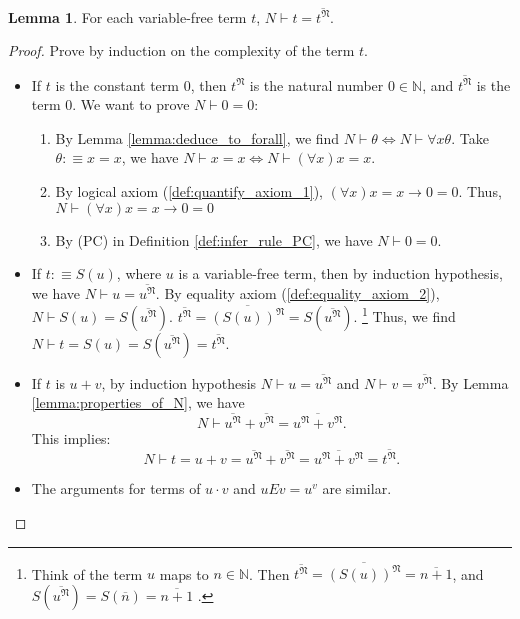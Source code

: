 \documentclass[11pt,letterpaper]{book}
\theoremstyle{definition}
\newtheorem{lemma}{Lemma}[section]
\begin{document}
\begin{lemma}\label{lemma:N_terms_equivalence}
For each variable-free term $t$, $N \vdash t = \overline{t^{\mathfrak{N}}}$.
\end{lemma}

\begin{proof}
Prove by induction on the complexity of the term $t$.

\begin{itemize}
\item{If $t$ is the constant term $0$, then $t^{\mathfrak{N}}$ is the natural number $0 \in \mathbb{N}$, and $\overline{t^{\mathfrak{N}}}$ is the term $0$. We want to prove $N \vdash 0 = 0$:  }

\begin{enumerate}
\item{By Lemma \ref{lemma:deduce_to_forall}, we find $N \vdash \theta \iff N \vdash \forall x \theta$. Take $\theta :\equiv x =x$, we have $N \vdash x = x \iff N \vdash (\forall x) x = x$.}
\item{By logical axiom (\ref{def:quantify_axiom_1}), $(\forall x ) x = x \rightarrow 0 = 0$. Thus, $N \vdash (\forall x ) x = x \rightarrow 0 = 0$ }
\item{By (PC) in Definition \ref{def:infer_rule_PC}, we have $N \vdash 0 =0$.}
\end{enumerate}

\item{If $t : \equiv S(u)$, where $u$ is a variable-free term, then by induction hypothesis, we have $N \vdash u = \overline{u^{\mathfrak{N}}}$. By equality axiom (\ref{def:equality_axiom_2}), $N \vdash S(u) = S( \overline{u^{\mathfrak{N}}} )$.  $\overline{t^{\mathfrak{N}}} = \overline{(S(u))^{\mathfrak{N}}} = S (\overline{u^{\mathfrak{N}}})$. \footnote{Think of the term $u$ maps to $n \in \mathbb{N}$. Then $ \overline{t^{\mathfrak{N}}} = \overline{(S(u))^{\mathfrak{N}}} = \overline{n+1} $, and $ S (\overline{u^{\mathfrak{N}}}) = S (\overline{n})  = \overline{n+1} $ .} Thus, we find $N \vdash t = S(u) = S( \overline{u^{\mathfrak{N}}} ) =\overline{t^{\mathfrak{N}}} $.}
\item{If $t$ is $ u + v$, by induction hypothesis $N \vdash u = \overline{u^{\mathfrak{N}}}$ and $N \vdash v = \overline{v^{\mathfrak{N}}}$. By Lemma \ref{lemma:properties_of_N}, we have 
$$ N \vdash \overline{u^{\mathfrak{N}}} + \overline{v^{\mathfrak{N}}} = \overline{ u^{\mathfrak{N}} + v^{\mathfrak{N}}} .$$
This implies:
$$ N \vdash t= u + v =  \overline{u^{\mathfrak{N}}} + \overline{v^{\mathfrak{N}}} = \overline{ u^{\mathfrak{N}} + v^{\mathfrak{N}}} =  \overline{ t^{\mathfrak{N}} } .$$
}
\item{The arguments for terms of $u \cdot v$ and $u E v = u^v$ are similar.}
\end{itemize}
\end{proof}
\end{document}
